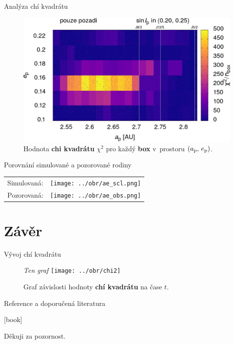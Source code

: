 \documentclass[xcolor=dvipsnames]{beamer}
\begin{document}
\begin{frame}[t]{\secname}{Analýza chí kvadrátu}
\begin{figure}
		\includegraphics[width=0.41\paperwidth]{../obr/ae_chi_emptyt.png}

		\caption{Hodnota \textbf{chi kvadrátu} $\chi^2$ pro každý \textbf{box} v~prostoru $(a_{\rm p},\,e_{\rm p})$.} \label{fig:ae_chi2}
	\end{figure}

\end{frame}

\begin{frame}[t]{\secname}{Porovnání simulované a pozorované rodiny}
	\begin{tabularx}{\textwidth}{c V}
		\centering
		Simulovaná: & \texttt{[image: ../obr/ae\_scl.png]}\\
		Pozorovaná: & \texttt{[image: ../obr/ae\_obs.png]}
	\end{tabularx}
\end{frame}


\section{Závěr}


\begin{frame}[c]{\secname}{Vývoj chí kvadrátu}
	\begin{figure}
		\centering
		\large \textit{Ten  graf}
		\texttt{[image: ../obr/chi2]}
		\caption{Graf závislosti hodnoty \textbf{chí kvadrátu} na čase $t$.}
	\end{figure}
\end{frame}

\begin{frame}[t]{\secname}{Reference a doporučená literatura}
	\printbibliography

	{\color{blue}\hdashrule[0.5ex]{\textwidth}{0.7pt}{2mm}}

	\newrefsection{}
	[book]
	\nocite{fmt}
	\nocite{murray00}
	\nocite{brozphd}
	\printbibliography
\end{frame}

\begin{frame}
	Děkuji za pozornost.
\end{frame}
\end{document}
